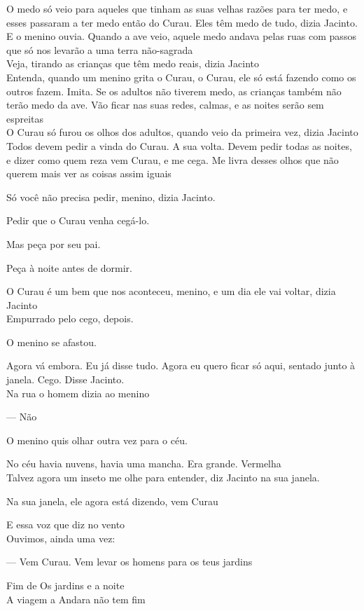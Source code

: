 O medo só veio para aqueles que tinham as suas velhas razões para ter
medo, e esses passaram a ter medo então do Curau. Eles têm medo de tudo,
dizia Jacinto. E o menino ouvia. Quando a ave veio, aquele medo andava
pelas ruas com passos que só nos levarão a uma terra não-sagrada\\

Veja, tirando as crianças que têm medo reais, dizia Jacinto\\

Entenda, quando um menino grita o Curau, o Curau, ele só está fazendo
como os outros fazem. Imita. Se os adultos não tiverem medo, as crianças
também não terão medo da ave. Vão ficar nas suas redes, calmas, e as
noites serão sem espreitas\\

O Curau só furou os olhos dos adultos, quando veio da primeira vez,
dizia Jacinto\\

Todos devem pedir a vinda do Curau. A sua volta. Devem pedir todas as
noites, e dizer como quem reza vem Curau, e me cega. Me livra desses
olhos que não querem mais ver as coisas assim iguais

Só você não precisa pedir, menino, dizia Jacinto.

Pedir que o Curau venha cegá-lo.

Mas peça por seu pai.

Peça à noite antes de dormir.

O Curau é um bem que nos aconteceu, menino, e um dia ele vai voltar,
dizia Jacinto\\

Empurrado pelo cego, depois.

O menino se afastou.

Agora vá embora. Eu já disse tudo. Agora eu quero ficar só aqui, sentado
junto à janela. Cego. Disse Jacinto.\\

Na rua o homem dizia ao menino

--- Não

O menino quis olhar outra vez para o céu.

No céu havia nuvens, havia uma mancha. Era grande. Vermelha\\

Talvez agora um inseto me olhe para entender, diz Jacinto na sua janela.

Na sua janela, ele agora está dizendo, vem Curau

\pagebreak

\vspace*{4cm}

E essa voz que diz no vento\\

Ouvimos, ainda uma vez:

--- Vem Curau. Vem levar os homens para os teus jardins


\vfill
Fim de Os jardins e a noite\\

A viagem a Andara não tem fim